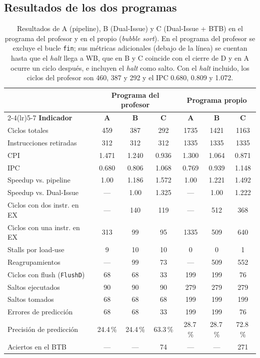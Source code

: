 \documentclass[12pt,a4paper]{article}
\newcommand{\sig}[1]{\texttt{#1}}
\begin{document}
\subsection{Resultados de los dos programas}

\begin{table}[H]
\centering
\small
\setlength{\tabcolsep}{5pt}
\begin{tabular}{@{}lcccccc@{}}
\toprule
& \multicolumn{3}{c}{\textbf{Programa del profesor}} & \multicolumn{3}{c}{\textbf{Programa propio}} \\
\cmidrule(lr){2-4}\cmidrule(lr){5-7}
\textbf{Indicador} & \textbf{A} & \textbf{B} & \textbf{C} & \textbf{A} & \textbf{B} & \textbf{C} \\
\midrule
Ciclos totales & 459 & 387 & 292 & 1735 & 1421 & 1163 \\
Instrucciones retiradas & 312 & 312 & 312 & 1335 & 1335 & 1335 \\
CPI & 1.471 & 1.240 & 0.936 & 1.300 & 1.064 & 0.871 \\
IPC & 0.680 & 0.806 & 1.068 & 0.769 & 0.939 & 1.148 \\
Speedup vs. pipeline & 1.00 & 1.186 & 1.572 & 1.00 & 1.221 & 1.492 \\
Speedup vs. Dual-Issue & --- & 1.00 & 1.325 & --- & 1.00 & 1.222 \\
\midrule
Ciclos con dos instr. en EX & --- & 140 & 119 & --- & 512 & 368 \\
Ciclos con una instr. en EX & 313 & 99 & 95 & 1335 & 509 & 640 \\
Stalls por load-use & 9 & 10 & 10 & 0 & 0 & 1 \\
Reagrupamientos & --- & 99 & 73 & --- & 509 & 552 \\
Ciclos con flush (\sig{FlushD}) & 68 & 68 & 33 & 199 & 199 & 76 \\
Saltos ejecutados & 90 & 90 & 90 & 279 & 279 & 279 \\
Saltos tomados & 68 & 68 & 68 & 199 & 199 & 199 \\
Errores de predicción & 68 & 68 & 33 & 199 & 199 & 76 \\
Precisión de predicción & 24.4\,\% & 24.4\,\% & 63.3\,\% & 28.7\,\% & 28.7\,\% & 72.8\,\% \\
Aciertos en el BTB & --- & --- & 74 & --- & --- & 271 \\
\bottomrule
\end{tabular}
\caption{Resultados de A (pipeline), B (Dual-Issue) y C (Dual-Issue + BTB) en el programa del profesor y en el propio (\textit{bubble sort}). En el programa del profesor se excluye el bucle \texttt{fin}; sus métricas adicionales (debajo de la línea) se cuentan hasta que el \textit{halt} llega a WB, que en B y C coincide con el cierre de D y en A ocurre un ciclo después, e incluyen el \textit{halt} como salto. Con el \textit{halt} incluido, los ciclos del profesor son 460, 387 y 292 y el IPC 0.680, 0.809 y 1.072.}
\label{tab:prof}
\label{tab:propio}
\end{table}
\end{document}
